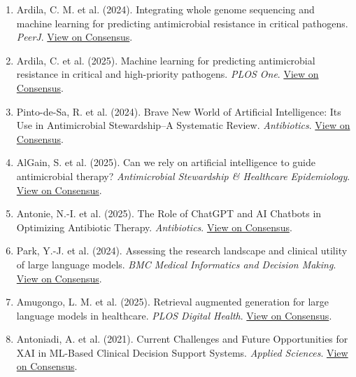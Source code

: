 \documentclass[11pt, letterpaper]{article}
\begin{document}
\begin{enumerate}[leftmargin=*]
    \item \label{ardila2024} Ardila, C. M. et al. (2024). Integrating whole genome sequencing and machine learning for predicting antimicrobial resistance in critical pathogens. \textit{PeerJ}. \href{https://consensus.app/papers/details/dd18acba2ab1532982dc97a67e2ec704/?utm_source=unknown}{View on Consensus}.
    \item \label{ardila2025} Ardila, C. et al. (2025). Machine learning for predicting antimicrobial resistance in critical and high-priority pathogens. \textit{PLOS One}. \href{https://consensus.app/papers/details/3c1bc3a411a65ac5abfd9bf035c15316/?utm_source=unknown}{View on Consensus}.
    \item \label{pinto2024} Pinto-de-Sa, R. et al. (2024). Brave New World of Artificial Intelligence: Its Use in Antimicrobial Stewardship--A Systematic Review. \textit{Antibiotics}. \href{https://consensus.app/papers/details/4b1d1024b494588cb81b97afa00e80a6/?utm_source=unknown}{View on Consensus}.
    \item \label{algain2025} AlGain, S. et al. (2025). Can we rely on artificial intelligence to guide antimicrobial therapy? \textit{Antimicrobial Stewardship \& Healthcare Epidemiology}. \href{https://consensus.app/papers/details/a9e8e10b1f805a0a888faef3767e2ff2/?utm_source=unknown}{View on Consensus}.
    \item \label{antonie2025} Antonie, N.-I. et al. (2025). The Role of ChatGPT and AI Chatbots in Optimizing Antibiotic Therapy. \textit{Antibiotics}. \href{https://consensus.app/papers/details/d66b7ce37dd2588c8418dcb1c8a6895b/?utm_source=unknown}{View on Consensus}.
    \item \label{park2024} Park, Y.-J. et al. (2024). Assessing the research landscape and clinical utility of large language models. \textit{BMC Medical Informatics and Decision Making}. \href{https://consensus.app/papers/details/89c0222087fa5c39b88eb06a4d71df0d/?utm_source=unknown}{View on Consensus}.
    \item \label{amugongo2025} Amugongo, L. M. et al. (2025). Retrieval augmented generation for large language models in healthcare. \textit{PLOS Digital Health}. \href{https://consensus.app/papers/details/9d1904c2383e5dcc954c87f5ad10a66f/?utm_source=unknown}{View on Consensus}.
    \item \label{antoniadi2021} Antoniadi, A. et al. (2021). Current Challenges and Future Opportunities for XAI in ML-Based Clinical Decision Support Systems. \textit{Applied Sciences}. \href{https://consensus.app/papers/details/d3f76f92a3575f96bec1e0c22c80a9f3/?utm_source=unknown}{View on Consensus}.

\end{enumerate}
\end{document}
